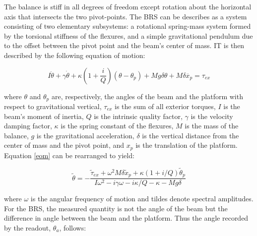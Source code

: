 \documentclass [12pt, proquest]{uwthesis}[2019]
\begin{document}
The balance is stiff in all degrees of freedom except rotation about the horizontal axis that intersects the two pivot-points. The BRS can be describes as a system consisting of two elementary subsystems: a rotational spring-mass system formed by the torsional stiffness of the flexures, and a simple gravitational pendulum due to the offset between the pivot point and the beam's center of mass. IT is then described by the following equation of motion:~\cite{venk2014}

\begin{equation}
I \ddot{\theta}+ \gamma \dot{\theta}+\kappa (1+ \frac{i}{Q})(\theta-\theta_p)+M g \delta \theta +M \delta \ddot{x_p}=\tau_{ex} \label{eom}
\end{equation}

where $\theta$ and $\theta_p$ are, respectively, the angles of the beam and the platform with respect to gravitational vertical, $\tau_{ex}$ is the sum of all exterior torques, $I$ is the beam's moment of inertia, $Q$ is the intrinsic quality factor, $\gamma$ is the velocity damping factor, $\kappa$ is the spring constant of the flexures, $M$ is the mass of the balance, $g$ is the gravitational acceleration, $\delta$ is the vertical distance from the center of mass and the pivot point, and $x_p$ is the translation of the platform. Equation \ref{eom} can be rearranged to yield:

\begin{equation}
\tilde{\theta} = -\frac{\tilde{\tau}_{ex}+\omega^2 M \delta \tilde{x}_p+\kappa (1+i/Q) \tilde{\theta}_p}{I\omega^2-i \gamma \omega -i \kappa /Q-\kappa -Mg\delta}
\end{equation}

where $\omega$ is the angular frequency of motion and tildes denote spectral amplitudes. For the BRS, the measured quantity is not the angle of the beam but the difference in angle between the beam and the platform. Thus the angle recorded by the readout, $\theta_a$, follows:
\end{document}
